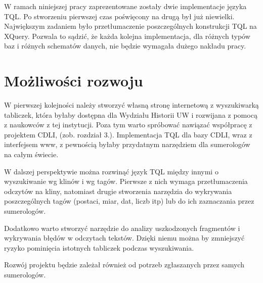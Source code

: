 W ramach niniejszej pracy zaprezentowane zostały dwie implementacje języka TQL. 
Po stworzeniu pierwszej czas poświęcony na drugą był już niewielki. 
Największym zadaniem było przetłumaczenie poszczególnych konstrukcji TQL na XQuery. 
Pozwala to sądzić, że każda kolejna implementacja, dla różnych typów baz i różnych schematów danych, 
nie będzie wymagała dużego nakładu pracy. 



\section*{Możliwości rozwoju}
W pierwszej kolejności należy stworzyć własną stronę internetową z wyszukiwarką tabliczek, 
która byłaby dostępna dla Wydziału Historii UW i rozwijana z pomocą z naukowców z tej instytucji. 
Poza tym warto spróbować nawiązać współpracę z projektem CDLI, (zob. rozdział 3.).
Implementacja TQL dla bazy CDLI, wraz z interfejsem www, z pewnością byłaby przydatnym narzędziem dla sumerologów na całym świecie.

W dalszej perspektywie można rozwinąć język TQL między innymi o wyszukiwanie wg klinów i wg tagów. 
Pierwsze z nich wymaga przetłumaczenia odczytów na kliny, natomiast drugie stworzenia narzędzia do wykrywania poszczególnych tagów
(postaci, miar, dat, liczb itp) lub do ich zaznaczania przez sumerologów.

Dodatkowo warto stworzyć narzędzie do analizy uszkodzonych fragmentów i wykrywania błędów w odczytach tekstów. 
Dzięki niemu można by zmniejszyć ryzyko pominięcia istotnych tabliczek podczas wyszukiwania. 

Rozwój projektu będzie zależał również od potrzeb zgłaszanych przez samych sumerologów.
